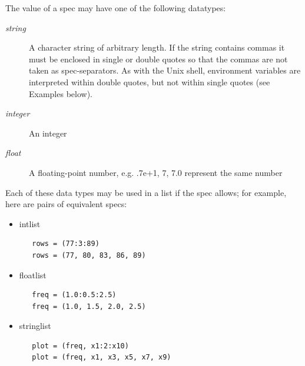 \documentclass[11pt,openany,twoside]{book}
\numberwithin{equation}{section}		%
\newcommand{\Subst}[1]{{\small\sf #1}}
\begin{document}
The {\sffamily value} of a spec may have one of the following datatypes:

\begin{description}
\item[{\ttfamily\itshape string}]
A character string of arbitrary length. If the string contains
commas it must be enclosed in single or double quotes so that
the commas are not taken as spec-separators.
As with the Unix shell, environment variables are interpreted
within double quotes, but not within single quotes (see Examples below).
      
\item[{\ttfamily\itshape {\ttfamily\itshape integer}\/}]
An integer
      
\item[{\ttfamily\itshape {\ttfamily\itshape float}\/}]
A floating-point number, e.g. .7e+1, 7, 7.0 represent the same number
      
\end{description}

\par
Each of these data types may be used in a list if the spec allows;
for example, here are pairs of equivalent specs:
\begin{itemize}
\item \Subst{intlist}
\begin{lstlisting}
   rows = (77:3:89)
   rows = (77, 80, 83, 86, 89)
\end{lstlisting}

\item \Subst{floatlist}
\begin{lstlisting}
   freq = (1.0:0.5:2.5)
   freq = (1.0, 1.5, 2.0, 2.5)
\end{lstlisting}

\item \Subst{stringlist}
\begin{lstlisting}
   plot = (freq, x1:2:x10)
   plot = (freq, x1, x3, x5, x7, x9)
\end{lstlisting}
\end{itemize}
\end{document}

